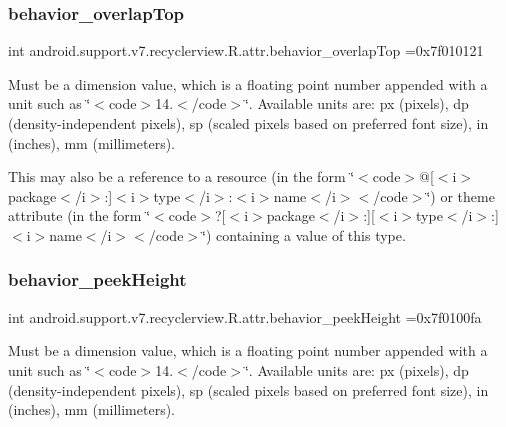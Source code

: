 \subsubsection{\texorpdfstring{behavior\+\_\+overlap\+Top}{behavior\_overlapTop}}
{\footnotesize\ttfamily int android.\+support.\+v7.\+recyclerview.\+R.\+attr.\+behavior\+\_\+overlap\+Top =0x7f010121\hspace{0.3cm}{\ttfamily [static]}}

Must be a dimension value, which is a floating point number appended with a unit such as \char`\"{}$<$code$>$14.\+5sp$<$/code$>$\char`\"{}. Available units are\+: px (pixels), dp (density-\/independent pixels), sp (scaled pixels based on preferred font size), in (inches), mm (millimeters). 

This may also be a reference to a resource (in the form \char`\"{}$<$code$>$@\mbox{[}$<$i$>$package$<$/i$>$\+:\mbox{]}$<$i$>$type$<$/i$>$\+:$<$i$>$name$<$/i$>$$<$/code$>$\char`\"{}) or theme attribute (in the form \char`\"{}$<$code$>$?\mbox{[}$<$i$>$package$<$/i$>$\+:\mbox{]}\mbox{[}$<$i$>$type$<$/i$>$\+:\mbox{]}$<$i$>$name$<$/i$>$$<$/code$>$\char`\"{}) containing a value of this type. \mbox{\label{classandroid_1_1support_1_1v7_1_1recyclerview_1_1R_1_1attr_a7dc984fda10b9d375ed5187f9b821fac}} 
\subsubsection{\texorpdfstring{behavior\+\_\+peek\+Height}{behavior\_peekHeight}}
{\footnotesize\ttfamily int android.\+support.\+v7.\+recyclerview.\+R.\+attr.\+behavior\+\_\+peek\+Height =0x7f0100fa\hspace{0.3cm}{\ttfamily [static]}}

Must be a dimension value, which is a floating point number appended with a unit such as \char`\"{}$<$code$>$14.\+5sp$<$/code$>$\char`\"{}. Available units are\+: px (pixels), dp (density-\/independent pixels), sp (scaled pixels based on preferred font size), in (inches), mm (millimeters). 

